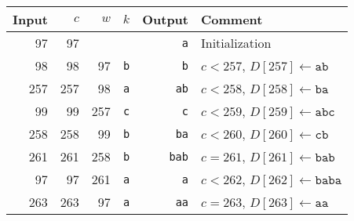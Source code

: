 \documentclass{article}
\begin{document}
\thispagestyle{empty}
\begin{tabular}{rrrrrl}
  Input & $c$    &    $w$ &     $k$ &  Output & Comment \\
  \hline
  97 &         97 &         &         & {\tt a} & Initialization\\
  98 &         98 &      97 & {\tt b} & {\tt b} & $c<257$, $D[257]\leftarrow\mathtt{ab}$\\
  257 &        257 &      98 & {\tt a} &{\tt ab} & $c<258$, $D[258]\leftarrow\mathtt{ba}$\\
  99 &         99 &     257 & {\tt c} & {\tt c} & $c<259$, $D[259]\leftarrow\mathtt{abc}$\\
  258 &        258 &      99 & {\tt b} &{\tt ba} & $c<260$, $D[260]\leftarrow\mathtt{cb}$\\
  261 &        261 &     258 & {\tt b} &{\tt bab}& $c=261$, $D[261]\leftarrow\mathtt{bab}$\\
  97 &         97 &     261 & {\tt a} & {\tt a} & $c<262$, $D[262]\leftarrow\mathtt{baba}$\\
  263 &        263 &      97 & {\tt a} &{\tt aa} & $c=263$, $D[263]\leftarrow\mathtt{aa}$
\end{tabular}
\end{document}
